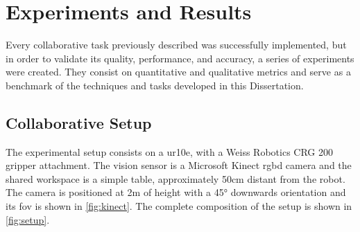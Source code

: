 \chapter{Experiments and Results}

\par Every collaborative task previously described was successfully implemented, but in order to validate its quality, performance, and accuracy, a series of experiments were created. They consist on quantitative and qualitative metrics and serve as a benchmark of the techniques and tasks developed in this Dissertation.

\section{Collaborative Setup}

\par The experimental setup consists on a \ac{ur10e}, with a Weiss Robotics CRG 200 gripper attachment. The vision sensor is a Microsoft Kinect \acs{rgbd} camera and the shared workspace is a simple table, approximately 50cm distant from the robot. The camera is positioned at 2m of height with a \ang{45} downwards orientation and its \ac{fov} is shown in \autoref{fig:kinect}. The complete composition of the setup is shown in \autoref{fig:setup}.

